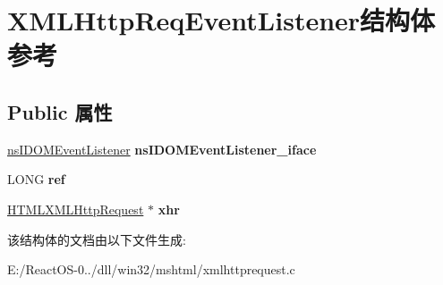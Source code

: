 \hypertarget{struct_x_m_l_http_req_event_listener}{}\section{X\+M\+L\+Http\+Req\+Event\+Listener结构体 参考}
\label{struct_x_m_l_http_req_event_listener}
\subsection*{Public 属性}
\begin{DoxyCompactItemize}
\item 
\mbox{\label{struct_x_m_l_http_req_event_listener_a9400d1187c39689e5488d2124f37d7bd}} 
\hyperlink{interfacens_i_d_o_m_event_listener}{ns\+I\+D\+O\+M\+Event\+Listener} {\bfseries ns\+I\+D\+O\+M\+Event\+Listener\+\_\+iface}
\item 
\mbox{\label{struct_x_m_l_http_req_event_listener_a174065ad664826c6afedc144733e238c}} 
L\+O\+NG {\bfseries ref}
\item 
\mbox{\label{struct_x_m_l_http_req_event_listener_a062ca79e97e66ca0cb12ca1fdf7706da}} 
\hyperlink{struct_h_t_m_l_x_m_l_http_request}{H\+T\+M\+L\+X\+M\+L\+Http\+Request} $\ast$ {\bfseries xhr}
\end{DoxyCompactItemize}


该结构体的文档由以下文件生成\+:\begin{DoxyCompactItemize}
\item 
E\+:/\+React\+O\+S-\/0../dll/win32/mshtml/xmlhttprequest.\+c\end{DoxyCompactItemize}
